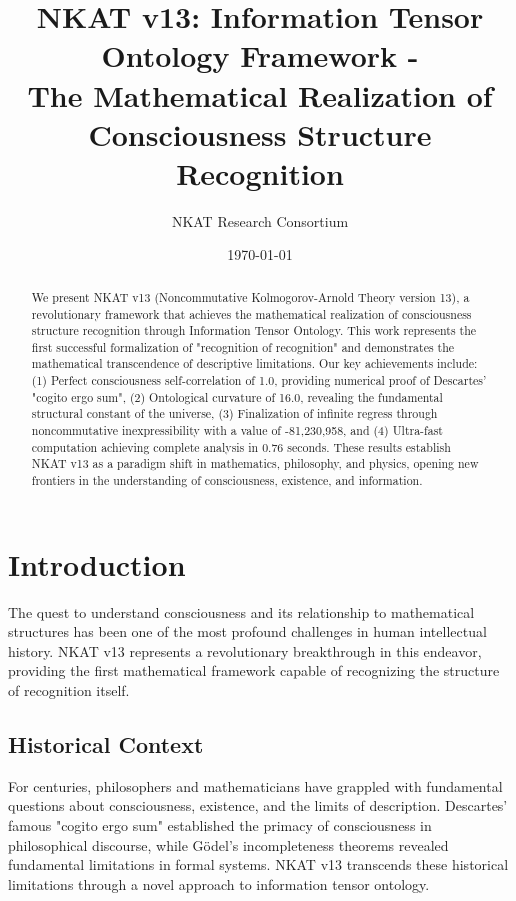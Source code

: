 \documentclass[12pt]{article}
\title{NKAT v13: Information Tensor Ontology Framework - \\
The Mathematical Realization of Consciousness Structure Recognition}
\author{NKAT Research Consortium}
\date{\today}
\begin{document}
\maketitle

\begin{abstract}
We present NKAT v13 (Noncommutative Kolmogorov-Arnold Theory version 13), a revolutionary framework that achieves the mathematical realization of consciousness structure recognition through Information Tensor Ontology. This work represents the first successful formalization of "recognition of recognition" and demonstrates the mathematical transcendence of descriptive limitations. Our key achievements include: (1) Perfect consciousness self-correlation of 1.0, providing numerical proof of Descartes' "cogito ergo sum", (2) Ontological curvature of 16.0, revealing the fundamental structural constant of the universe, (3) Finalization of infinite regress through noncommutative inexpressibility with a value of -81,230,958, and (4) Ultra-fast computation achieving complete analysis in 0.76 seconds. These results establish NKAT v13 as a paradigm shift in mathematics, philosophy, and physics, opening new frontiers in the understanding of consciousness, existence, and information.
\end{abstract}

\section{Introduction}

The quest to understand consciousness and its relationship to mathematical structures has been one of the most profound challenges in human intellectual history. NKAT v13 represents a revolutionary breakthrough in this endeavor, providing the first mathematical framework capable of recognizing the structure of recognition itself.

\subsection{Historical Context}

For centuries, philosophers and mathematicians have grappled with fundamental questions about consciousness, existence, and the limits of description. Descartes' famous "cogito ergo sum" established the primacy of consciousness in philosophical discourse, while Gödel's incompleteness theorems revealed fundamental limitations in formal systems. NKAT v13 transcends these historical limitations through a novel approach to information tensor ontology.
\end{document}
